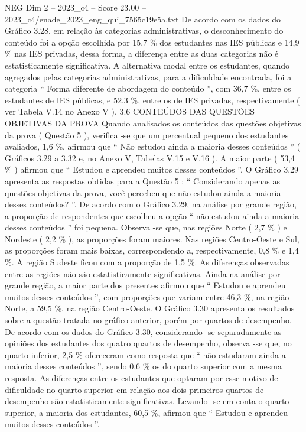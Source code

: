 \begin{textsample}{NEG Dim 2 – 2023\_c4 – Score 23.00 – 2023\_c4/enade\_2023\_eng\_qui\_7565c19e5a.txt}
De acordo com os dados do Gráfico 3.28, em relação às categorias administrativas, o desconhecimento do conteúdo foi a opção escolhida por 15,7 \% dos estudantes nas IES públicas e 14,9 \% nas IES privadas, dessa forma, a diferença entre as duas categorias não é estatisticamente significativa.
A alternativa modal entre os estudantes, quando agregados pelas categorias administrativas, para a dificuldade encontrada, foi a categoria “ Forma diferente de abordagem do conteúdo ”, com 36,7 \%, entre os estudantes de IES públicas, e 52,3 \%, entre os de IES privadas, respectivamente ( ver Tabela V.14 no Anexo V ). 3.6 CONTEÚDOS DAS QUESTÕES OBJETIVAS DA PROVA Quando analisados os conteúdos das questões objetivas da prova ( Questão 5 ), verifica -se que um percentual pequeno dos estudantes avaliados, 1,6 \%, afirmou que “ Não estudou ainda a maioria desses conteúdos ” ( Gráficos 3.29 a 3.32 e, no Anexo V, Tabelas V.15 e V.16 ).
A maior parte ( 53,4 \% ) afirmou que “ Estudou e aprendeu muitos desses conteúdos ”.
O Gráfico 3.29 apresenta as respostas obtidas para a Questão 5 : “ Considerando apenas as questões objetivas da prova, você percebeu que não estudou ainda a maioria desses conteúdos? ”.
De acordo com o Gráfico 3.29, na análise por grande região, a proporção de respondentes que escolheu a opção “ não estudou ainda a maioria desses conteúdos ” foi pequena.
Observa -se que, nas regiões Norte ( 2,7 \% ) e Nordeste ( 2,2 \% ), as proporções foram maiores.
Nas regiões Centro-Oeste e Sul, as proporções foram mais baixas, correspondendo a, respectivamente, 0,8 \% e 1,4 \%.
A região Sudeste ficou com a proporção de 1,5 \%.
As diferenças observadas entre as regiões não são estatisticamente significativas.
Ainda na análise por grande região, a maior parte dos presentes afirmou que “ Estudou e aprendeu muitos desses conteúdos ”, com proporções que variam entre 46,3 \%, na região Norte, a 59,5 \%, na região Centro-Oeste.
O Gráfico 3.30 apresenta os resultados sobre a questão tratada no gráfico anterior, porém por quartos de desempenho.
De acordo com os dados do Gráfico 3.30, considerando -se separadamente as opiniões dos estudantes dos quatro quartos de desempenho, observa -se que, no quarto inferior, 2,5 \% ofereceram como resposta que “ não estudaram ainda a maioria desses conteúdos ”, sendo 0,6 \% os do quarto superior com a mesma resposta.
As diferenças entre os estudantes que optaram por esse motivo de dificuldade no quarto superior em relação aos dois primeiros quartos de desempenho são estatisticamente significativas.
Levando -se em conta o quarto superior, a maioria dos estudantes, 60,5 \%, afirmou que “ Estudou e aprendeu muitos desses conteúdos ”.

\end{textsample}
